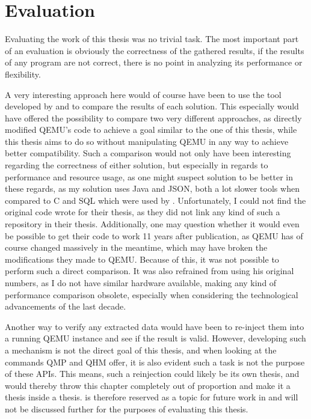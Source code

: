
\chapter{Evaluation}\label{chap:Evaluation}
Evaluating the work of this thesis was no trivial task.
The most important part of an evaluation is obviously the correctness of the gathered results,
if the results of any program are not correct, there is no point in analyzing its performance or flexibility.

A very interesting approach here would of course have been to use the tool developed by \citeauthor{kitcheckpoints}
and to compare the results of each solution.
This especially would have offered the possibility to compare two very different approaches,
as \citeauthor{kitcheckpoints} directly modified QEMU's code to achieve a goal similar to the one of this thesis,
while this thesis aims to do so without manipulating QEMU in any way to achieve better compatibility.
Such a comparison would not only have been interesting regarding the correctness of either solution,
but especially in regards to performance and resource usage,
as one might suspect \citeauthor{kitcheckpoints} solution to be better in these regards,
as my solution uses Java and JSON, both a lot slower tools when compared to C and SQL which were used by \citeauthor{kitcheckpoints}.
Unfortunately, I could not find the original code \citeauthor{kitcheckpoints} wrote for their thesis,
as they did not link any kind of such a repository in their thesis.
Additionally, one may question whether it would even be possible to get their code to work 11 years after publication,
as QEMU has of course changed massively in the meantime, which may have broken the modifications they made to QEMU.
Because of this, it was not possible to perform such a direct comparison.
It was also refrained from using his original numbers,
as I do not have similar hardware available,
making any kind of performance comparison obsolete,
especially when considering the technological advancements of the last decade\cite{kitcheckpoints}.

Another way to verify any extracted data would have been to re-inject them into a running QEMU instance and see if the result is valid.
However, developing such a mechanism is not the direct goal of this thesis,
and when looking at the commands QMP and QHM offer, it is also evident such a task is not the purpose of these APIs.
This means, such a reinjection could likely be its own thesis,
and would thereby throw this chapter completely out of proportion
and make it a thesis inside a thesis.
 is therefore reserved as a topic for future work in 
and will not be discussed further for the purposes of evaluating this thesis.


